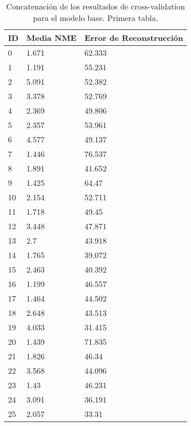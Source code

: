 \begin{table}[!ht]
    \centering
    \caption{Concatenación de los resultados de cross-validation para el modelo base. Primera tabla.}
    \begin{tabular}{|l|l|l|}
    \hline
        \cellcolor{gray!25}\textbf{ID} & \cellcolor{gray!25}\textbf{Media NME} & \cellcolor{gray!25}\textbf{Error de Reconstrucción} \\ \hline
        0 & 1.671 & 62.333 \\ \hline
        1 & 1.191 & 55.231 \\ \hline
        2 & 5.091 & 52.382 \\ \hline
        3 & 3.378 & 52.769 \\ \hline
        4 & 2.369 & 49.806 \\ \hline
        5 & 2.357 & 53.961 \\ \hline
        6 & 4.577 & 49.137 \\ \hline
        7 & 1.446 & 76.537 \\ \hline
        8 & 1.891 & 41.652 \\ \hline
        9 & 1.425 & 64.47 \\ \hline
        10 & 2.154 & 52.711 \\ \hline
        11 & 1.718 & 49.45 \\ \hline
        12 & 3.448 & 47.871 \\ \hline
        13 & 2.7 & 43.918 \\ \hline
        14 & 1.765 & 39.072 \\ \hline
        15 & 2.463 & 40.392 \\ \hline
        16 & 1.199 & 46.557 \\ \hline
        17 & 1.464 & 44.502 \\ \hline
        18 & 2.648 & 43.513 \\ \hline
        19 & 4.033 & 31.415 \\ \hline
        20 & 1.439 & 71.835 \\ \hline
        21 & 1.826 & 46.34 \\ \hline
        22 & 3.568 & 44.096 \\ \hline
        23 & 1.43 & 46.231 \\ \hline
        24 & 3.091 & 36.191 \\ \hline
        25 & 2.057 & 33.31 \\ \hline
    \end{tabular}
    \label{table:ModelBase_landmarkresume}
\end{table}



